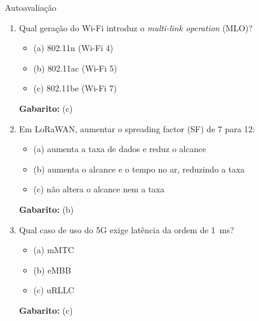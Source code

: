 \documentclass[aspectratio=169,11pt]{beamer}
\begin{document}
\begin{frame}{Autoavaliação}
  \small
  \begin{enumerate}
    \item Qual geração do Wi-Fi introduz o \emph{multi-link operation} (MLO)?
      \begin{itemize}
        \item (a) 802.11n (Wi-Fi 4)
        \item (b) 802.11ac (Wi-Fi 5)
        \item (c) 802.11be (Wi-Fi 7)
      \end{itemize}
      \pause
      \textbf{Gabarito:} (c)
    \item Em LoRaWAN, aumentar o spreading factor (SF) de 7 para 12:
      \begin{itemize}
        \item (a) aumenta a taxa de dados e reduz o alcance
        \item (b) aumenta o alcance e o tempo no ar, reduzindo a taxa
        \item (c) não altera o alcance nem a taxa
      \end{itemize}
      \pause
      \textbf{Gabarito:} (b)
    \item Qual caso de uso do 5G exige latência da ordem de 1~ms?
      \begin{itemize}
        \item (a) mMTC
        \item (b) eMBB
        \item (c) uRLLC
      \end{itemize}
      \pause
      \textbf{Gabarito:} (c)
  \end{enumerate}
\end{frame}
\end{document}
